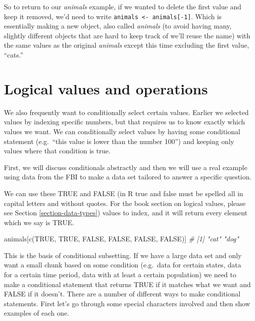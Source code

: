 \documentclass[
  a4paper,
]{krantz}
\makeatletter
\newenvironment{Shaded}{\begin{snugshade}}{\end{snugshade}}
\newcommand{\CommentTok}[1]{\textcolor[rgb]{0.37,0.37,0.37}{\textit{#1}}}
\newcommand{\ConstantTok}[1]{\textcolor[rgb]{0,0,0}{#1}}
\newcommand{\FunctionTok}[1]{\textcolor[rgb]{0,0,0}{#1}}
\newcommand{\NormalTok}[1]{#1}
\newenvironment{kframe}{%
\medskip{}
\setlength{\fboxsep}{.8em}
 \def\at@end@of@kframe{}%
 \ifinner\ifhmode%
  \def\at@end@of@kframe{\end{minipage}}%
  \begin{minipage}{\columnwidth}%
 \fi\fi%
 \def\FrameCommand##1{\hskip\@totalleftmargin \hskip-\fboxsep
 \colorbox{shadecolor}{##1}\hskip-\fboxsep
     \hskip-\linewidth \hskip-\@totalleftmargin \hskip\columnwidth}%
 \MakeFramed {\advance\hsize-\width
   \@totalleftmargin\z@ \linewidth\hsize
   \@setminipage}}%
 {\par\unskip\endMakeFramed%
 \at@end@of@kframe}
\renewenvironment{Shaded}{\begin{kframe}}{\end{kframe}}
\makeatother
\begin{document}
So to return to our \emph{animals} example, if we wanted to
delete the first value and keep it removed, we'd need to
write \texttt{animals\ \textless{}-\ animals{[}-1{]}}. Which
is essentially making a new object, also called
\emph{animals} (to avoid having many, slightly different
objects that are hard to keep track of we'll reuse the name)
with the same values as the original \emph{animals} except
this time excluding the first value, ``cats.''

\hypertarget{logical-values-and-operations}{%
\section{Logical values and
operations}\label{logical-values-and-operations}}

We also frequently want to conditionally select certain
values. Earlier we selected values by indexing specific
numbers, but that requires us to know exactly which values
we want. We can conditionally select values by having some
conditional statement (e.g.~``this value is lower than the
number 100'') and keeping only values where that condition
is true.

First, we will discuss conditionals abstractly and then we
will use a real example using data from the FBI to make a
data set tailored to answer a specific question.

We can use these TRUE and FALSE (in R true and false must be
spelled all in capital letters and without quotes. For the
book section on logical values, please see Section
\ref{section-data-types}) values to index, and it will
return every element which we say is TRUE.

\begin{Shaded}
\begin{Highlighting}[]
\NormalTok{animals[}\FunctionTok{c}\NormalTok{(}\ConstantTok{TRUE}\NormalTok{, }\ConstantTok{TRUE}\NormalTok{, }\ConstantTok{FALSE}\NormalTok{, }\ConstantTok{FALSE}\NormalTok{, }\ConstantTok{FALSE}\NormalTok{, }\ConstantTok{FALSE}\NormalTok{)]}
\CommentTok{\# [1] "cat" "dog"}
\end{Highlighting}
\end{Shaded}

This is the basis of conditional subsetting. If we have a
large data set and only want a small chunk based on some
condition (e.g.~data for certain states, data for a certain
time period, data with at least a certain population) we
need to make a conditional statement that returns TRUE if it
matches what we want and FALSE if it doesn't. There are a
number of different ways to make conditional statements.
First let's go through some special characters involved and
then show examples of each one.
\end{document}
